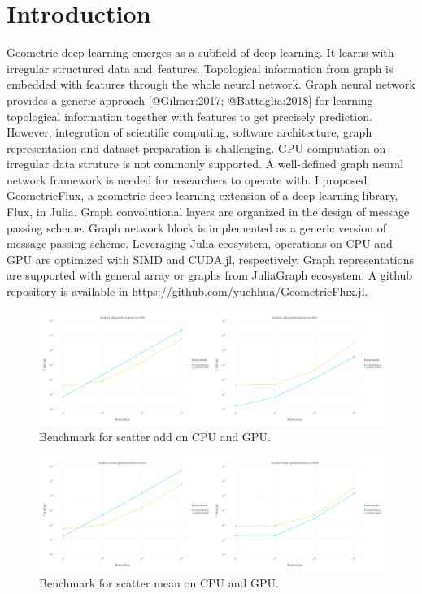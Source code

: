\documentclass{juliacon}
\begin{document}
\section{Introduction}

Geometric deep learning emerges as a subfield of deep learning. It learns with irregular
structured data and features. Topological information from graph is embedded with features
through the whole neural network. Graph neural network provides a generic approach [@Gilmer:2017; @Battaglia:2018]
for learning topological information together with features to get precisely prediction.
However, integration of scientific computing, software architecture, graph representation
and dataset preparation is challenging. GPU computation on irregular data struture is not
commonly supported. A well-defined graph neural network framework is needed for researchers
to operate with. I proposed GeometricFlux, a geometric deep learning extension of a deep learning
library, Flux, in Julia. Graph convolutional layers are organized in the design of message
passing scheme. Graph network block is implemented as a generic version of message passing
scheme. Leveraging Julia ecosystem, operations on CPU and GPU are optimized with SIMD and
CUDA.jl, respectively. Graph representations are supported with general array or graphs from
JuliaGraph ecosystem.
A github repository is available in https://github.com/yuehhua/GeometricFlux.jl.

\begin{figure}[t]
\centerline{\includegraphics[width=18cm]{figures/scatter_add.png}}
\caption{Benchmark for scatter add on CPU and GPU.}
    \label{fig:scatter_add}
\end{figure}

\begin{figure}[h]
\centerline{\includegraphics[width=18cm]{figures/scatter_mean.png}}
\caption{Benchmark for scatter mean on CPU and GPU.}
    \label{fig:scatter_mean}
\end{figure}
\end{document}
